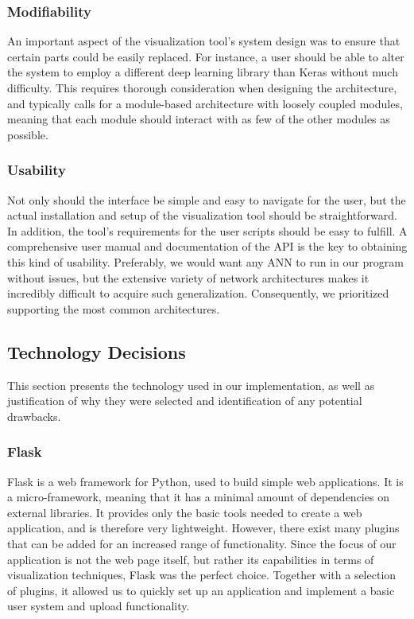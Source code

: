 \subsubsection{Modifiability}

An important aspect of the visualization tool's system design was to ensure that certain parts could be easily replaced. For instance, a user should be able to alter the system to employ a different deep learning library than Keras without much difficulty. This requires thorough consideration when designing the architecture, and typically calls for a module-based architecture with loosely coupled modules, meaning that each module should interact with as few of the other modules as possible.

\subsubsection{Usability}

Not only should the interface be simple and easy to navigate for the user, but the actual installation and setup of the visualization tool should be straightforward. In addition, the tool's requirements for the user scripts should be easy to fulfill. A comprehensive user manual and documentation of the API is the key to obtaining this kind of usability. Preferably, we would want any ANN to run in our program without issues, but the extensive variety of network architectures makes it incredibly difficult to acquire such generalization. Consequently, we prioritized supporting the most common architectures.

\subsection{Technology Decisions}

This section presents the technology used in our implementation, as well as justification of why they were selected and identification of any potential drawbacks.

\subsubsection{Flask}

Flask is a web framework for Python, used to build simple web applications. It is a micro-framework, meaning that it has a minimal amount of dependencies on external libraries. It provides only the basic tools needed to create a web application, and is therefore very lightweight. However, there exist many plugins that can be added for an increased range of functionality. Since the focus of our application is not the web page itself, but rather its capabilities in terms of visualization techniques, Flask was the perfect choice. Together with a selection of plugins, it allowed us to quickly set up an application and implement a basic user system and upload functionality.


